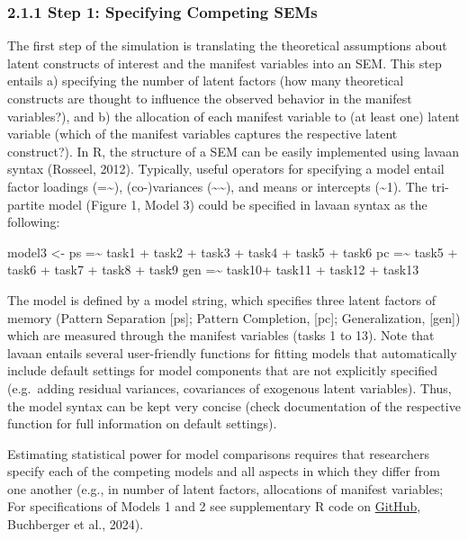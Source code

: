 \documentclass[
  man,floatsintext]{apa6}
\newenvironment{Shaded}{\begin{snugshade}}{\end{snugshade}}
\newcommand{\NormalTok}[1]{#1}
\newcommand{\OtherTok}[1]{\textcolor[rgb]{0.56,0.35,0.01}{#1}}
\newcommand{\StringTok}[1]{\textcolor[rgb]{0.31,0.60,0.02}{#1}}
\begin{document}
\hypertarget{step-1-specifying-competing-sems}{%
\subsubsection{2.1.1 Step 1: Specifying Competing SEMs}\label{step-1-specifying-competing-sems}}

The first step of the simulation is translating the theoretical assumptions about latent constructs of interest and the manifest variables into an SEM. This step entails a) specifying the number of latent factors (how many theoretical constructs are thought to influence the observed behavior in the manifest variables?), and b) the allocation of each manifest variable to (at least one) latent variable (which of the manifest variables captures the respective latent construct?). In R, the structure of a SEM can be easily implemented using lavaan syntax (Rosseel, 2012). Typically, useful operators for specifying a model entail factor loadings (=\textasciitilde), (co-)variances (\textasciitilde\textasciitilde), and means or intercepts (\textasciitilde1). The tri-partite model (Figure 1, Model 3) could be specified in lavaan syntax as the following:

\begin{Shaded}
\begin{Highlighting}[]
\NormalTok{model3 }\OtherTok{\textless{}{-}}
  \StringTok{\textquotesingle{}ps  =\textasciitilde{} task1 + task2 + task3 + task4 + task5 + task6}
\StringTok{   pc  =\textasciitilde{} task5 + task6 + task7 + task8 + task9}
\StringTok{   gen =\textasciitilde{} task10+ task11 + task12 + task13\textquotesingle{}}
\end{Highlighting}
\end{Shaded}

The model is defined by a model string, which specifies three latent factors of memory (Pattern Separation {[}ps{]}; Pattern Completion, {[}pc{]}; Generalization, {[}gen{]}) which are measured through the manifest variables (tasks 1 to 13). Note that lavaan entails several user-friendly functions for fitting models that automatically include default settings for model components that are not explicitly specified (e.g.~adding residual variances, covariances of exogenous latent variables). Thus, the model syntax can be kept very concise (check documentation of the respective function for full information on default settings).

Estimating statistical power for model comparisons requires that researchers specify each of the competing models and all aspects in which they differ from one another (e.g., in number of latent factors, allocations of manifest variables; For specifications of Models 1 and 2 see supplementary R code on \href{https://github.com/ebuchberger/Estimating-Power-for-SEM}{GitHub}, Buchberger et al., 2024).
\end{document}
